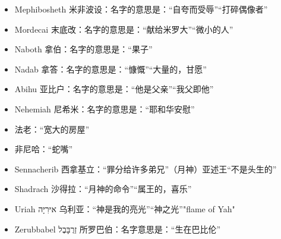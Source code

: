 \begin{itemize}
　　\item Mephibosheth  米非波设：名字的意思是：“自夸而受辱”“打碎偶像者”
　　\item Mordecai  末底改：名字的意思是：“献给米罗大”“微小的人”
　　\item Naboth  拿伯：名字的意思是：“果子”
　　\item Nadab  拿答：名字的意思是：“慷慨”“大量的，甘愿”
　　\item Abihu  亚比户：名字的意思是：“他是父亲”“我父即他”
　　\item Nehemiah  尼希米：名字的意思是：“耶和华安慰”
　　\item 法老：“宽大的房屋”
　　\item 非尼哈：“蛇嘴”
　　\item Sennacherib  西拿基立：“罪分给许多弟兄”（月神）亚述王“不是头生的”
　　\item Shadrach  沙得拉：“月神的命令”“属王的，喜乐”
　　\item Uriah איּרִיָּה 乌利亚：“神是我的亮光”“神之光”"flame of Yah"
　　\item Zerubbabel זְרֻבָּבֶל 所罗巴伯：名字意思是：“生在巴比伦”
\end{itemize}

